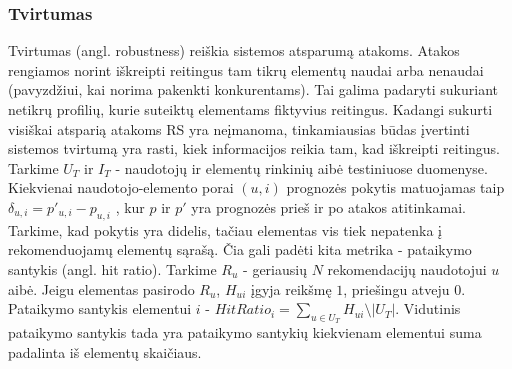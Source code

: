 \documentclass{VUMIFInfMagistrinis}
\begin{document}
\subsubsection{Tvirtumas}
Tvirtumas (angl. robustness) reiškia sistemos atsparumą atakoms. Atakos rengiamos norint iškreipti reitingus tam tikrų elementų naudai arba nenaudai (pavyzdžiui, kai norima pakenkti konkurentams). Tai galima padaryti sukuriant netikrų profilių, kurie suteiktų elementams fiktyvius reitingus. Kadangi sukurti visiškai atsparią atakoms RS yra neįmanoma, tinkamiausias būdas įvertinti sistemos tvirtumą yra rasti, kiek informacijos reikia tam, kad iškreipti reitingus. 
\newline
\indent
Tarkime $U_T$ ir $I_T$ - naudotojų ir elementų rinkinių aibė testiniuose duomenyse. Kiekvienai naudotojo-elemento porai $(u,i)$ prognozės pokytis matuojamas taip $\delta_{u,i} = p\prime_{u,i} - p_{u,i}$ , kur $p$ ir $p\prime$ yra prognozės prieš ir po atakos atitinkamai. Tarkime, kad pokytis yra didelis, tačiau elementas vis tiek nepatenka į rekomenduojamų elementų sąrašą. Čia gali padėti kita metrika - pataikymo santykis (angl. hit ratio). Tarkime $R_u$ - geriausių $N$ rekomendacijų naudotojui $u$ aibė. Jeigu elementas pasirodo  $R_u$, $H_{ui}$ įgyja reikšmę $1$, priešingu atveju $0$. Pataikymo santykis elementui $i$ - $HitRatio_i = \sum \limits_{u \in U_T} H_{ui} \setminus |U_T|$. Vidutinis pataikymo santykis tada yra pataikymo santykių kiekvienam elementui suma padalinta iš elementų skaičiaus.
\end{document}
